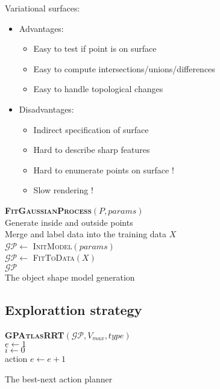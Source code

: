 Variational surfaces:
\begin{itemize}
\item Advantages:
\begin{itemize} 
\item Easy to test if point is on surface
\item Easy to compute intersections/unions/differences
\item Easy to handle topological changes
\end{itemize}
\item Disadvantages:
\begin{itemize}
\item Indirect specification of surface
\item Hard to describe sharp features
\item Hard to enumerate points on surface !
\item Slow rendering !
\end{itemize}
\end{itemize}

\begin{algorithm}[h]
\textbf{\textsc{FitGaussianProcess}}$(P, params)$\\ %
\LinesNumbered
\DontPrintSemicolon
\SetAlgoVlined {} 
  Generate inside and outside points \\
  Merge and label data into the training data $X$ \\
  $\mathcal{GP} \leftarrow$ \textsc{InitModel}$(params)$ \\
  $\mathcal{GP} \leftarrow$ \textsc{FitToData}$(X)$ \\
  \Return $\mathcal{GP}$ \\
\caption{The object shape model generation} \label{algo:strategy}
\end{algorithm}

\subsection{Explorattion strategy}
\label{sec:strategy}


\begin{algorithm}[h]
\textbf{\textsc{GPAtlasRRT}}$(\mathcal{GP}, V_{max}, type)$\\ %
\LinesNumbered
\DontPrintSemicolon
\SetAlgoVlined {} 
  $e \leftarrow 1$ \\
  {
    $i \leftarrow 0$ \\
    {
      \Return action 
    }
    $e \leftarrow e + 1$ \\
  }

\caption{The best-next action planner} \label{algo:strategy}
\end{algorithm}

